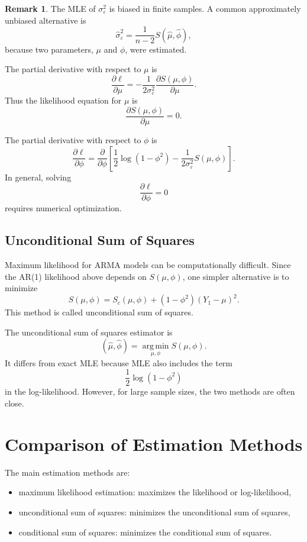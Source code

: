 \documentclass[12pt,oneside]{book}
\numberwithin{equation}{section}
\theoremstyle{definition}
\newtheorem{remark}{Remark}[section]
\theoremstyle{plain}
\theoremstyle{remark}
\newcommand{\argmin}{\operatorname*{arg\,min}}
\begin{document}
\begin{remark}
The MLE of $\sigma_\varepsilon^2$ is biased in finite samples. A common approximately unbiased alternative is
\[
\widehat{\sigma}_\varepsilon^2
=
\frac{1}{n-2}S(\widehat{\mu},\widehat{\phi}),
\]
because two parameters, $\mu$ and $\phi$, were estimated.
\end{remark}

The partial derivative with respect to $\mu$ is
\[
\frac{\partial \ell}{\partial \mu}
=
-\frac{1}{2\sigma_\varepsilon^2}
\frac{\partial S(\mu,\phi)}{\partial \mu}.
\]
Thus the likelihood equation for $\mu$ is
\[
\frac{\partial S(\mu,\phi)}{\partial \mu}=0.
\]

The partial derivative with respect to $\phi$ is
\[
\frac{\partial \ell}{\partial \phi}
=
\frac{\partial}{\partial \phi}
\left[
\frac{1}{2}\log(1-\phi^2)
-
\frac{1}{2\sigma_\varepsilon^2}S(\mu,\phi)
\right].
\]
In general, solving
\[
\frac{\partial \ell}{\partial \phi}=0
\]
requires numerical optimization.

\subsection{Unconditional Sum of Squares}

Maximum likelihood for ARMA models can be computationally difficult. Since the AR(1) likelihood above depends on $S(\mu,\phi)$, one simpler alternative is to minimize
\[
S(\mu,\phi)
=
S_c(\mu,\phi)
+
(1-\phi^2)(Y_1-\mu)^2.
\]
This method is called unconditional sum of squares.

The unconditional sum of squares estimator is
\[
(\widehat{\mu},\widehat{\phi})
=
\argmin_{\mu,\phi}S(\mu,\phi).
\]
It differs from exact MLE because MLE also includes the term
\[
\frac{1}{2}\log(1-\phi^2)
\]
in the log-likelihood. However, for large sample sizes, the two methods are often close.

\section{Comparison of Estimation Methods}

The main estimation methods are:

\begin{itemize}
\item maximum likelihood estimation: maximizes the likelihood or log-likelihood,
\item unconditional sum of squares: minimizes the unconditional sum of squares,
\item conditional sum of squares: minimizes the conditional sum of squares.
\end{itemize}
\end{document}
